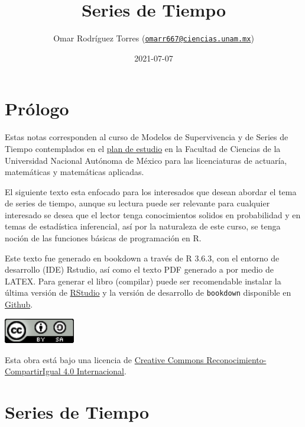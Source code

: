 \documentclass[
  spanish,
]{book}
\title{Series de Tiempo}
\author{Omar Rodríguez Torres (\href{mailto:omarr667@ciencias.unam.mx}{\nolinkurl{omarr667@ciencias.unam.mx}})}
\date{2021-07-07}
\theoremstyle{remark}
\begin{document}
\maketitle

{
\setcounter{tocdepth}{1}
\tableofcontents
}
\hypertarget{pruxf3logo}{%
\chapter*{Prólogo}\label{pruxf3logo}}

Estas notas corresponden al curso de Modelos de Supervivencia y de Series de Tiempo contemplados en el \href{http://www.fciencias.unam.mx/licenciatura/asignaturas/2017/1739}{plan de estudio} en la Facultad de Ciencias de la Universidad Nacional Autónoma de México para las licenciaturas de actuaría, matemáticas y matemáticas aplicadas.

El siguiente texto esta enfocado para los interesados que desean abordar el tema de series de tiempo, aunque su lectura puede ser relevante para cualquier interesado se desea que el lector tenga conocimientos solidos en probabilidad y en temas de estadística inferencial, así por la naturaleza de este curso, se tenga noción de las funciones básicas de programación en R.

Este texto fue generado en bookdown a través de R 3.6.3, con el entorno de desarrollo (IDE) Rstudio, así como el texto PDF generado a por medio de LATEX. Para generar el libro (compilar) puede ser recomendable instalar la última versión de \href{(https://www.rstudio.com/products/rstudio/download/)}{RStudio} y la versión de desarrollo de \texttt{bookdown} disponible en \href{https://github.com/rstudio/bookdown}{Github}.

\begin{flushleft}\includegraphics[width=1.22in]{images/by-sa-88x31} \end{flushleft}

Esta obra está bajo una licencia de \href{https://creativecommons.org/licenses/by-sa/4.0/deed.es}{Creative Commons Reconocimiento-CompartirIgual 4.0 Internacional}.

\hypertarget{series-de-tiempo}{%
\chapter{Series de Tiempo}\label{series-de-tiempo}}
\end{document}
